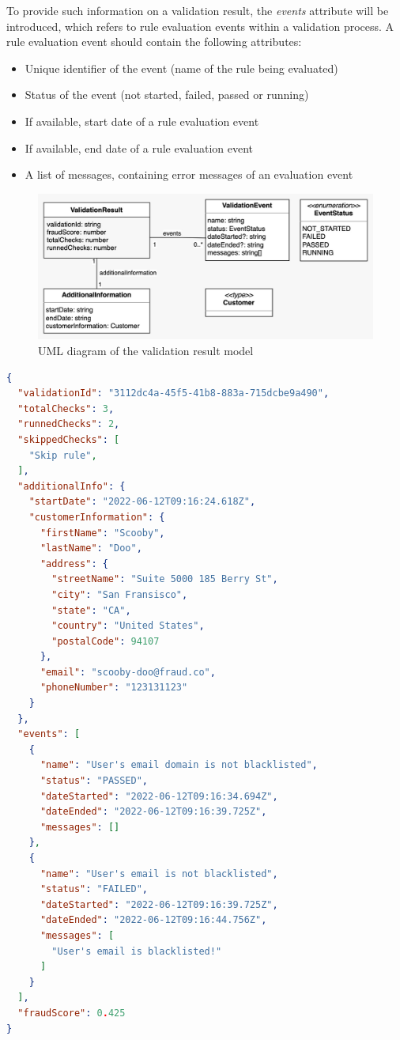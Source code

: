 To provide such information on a validation result, the \emph{events} attribute will be introduced, which refers to rule evaluation events within a validation process. A rule evaluation event should contain the following attributes:

\begin{itemize}
  \item Unique identifier of the event (name of the rule being evaluated)
  \item Status of the event (not started, failed, passed or running) 
  \item If available, start date of a rule evaluation event 
  \item If available, end date of a rule evaluation event 
  \item A list of messages, containing error messages of an evaluation event
\end{itemize}

\begin{figure}[!ht]
  \includegraphics[width=\textwidth]{diagrams/entity_validation_result.jpeg}
  \caption{UML diagram of the validation result model}
 \end{figure}
 
\begin{lstlisting}[caption={Validation result example (JSON)}, language=json]
{
  "validationId": "3112dc4a-45f5-41b8-883a-715dcbe9a490",
  "totalChecks": 3,
  "runnedChecks": 2,
  "skippedChecks": [
    "Skip rule",
  ],
  "additionalInfo": {
    "startDate": "2022-06-12T09:16:24.618Z",
    "customerInformation": {
      "firstName": "Scooby",
      "lastName": "Doo",
      "address": {
        "streetName": "Suite 5000 185 Berry St",
        "city": "San Fransisco",
        "state": "CA",
        "country": "United States",
        "postalCode": 94107
      },
      "email": "scooby-doo@fraud.co",
      "phoneNumber": "123131123"
    }
  },
  "events": [
    {
      "name": "User's email domain is not blacklisted",
      "status": "PASSED",
      "dateStarted": "2022-06-12T09:16:34.694Z",
      "dateEnded": "2022-06-12T09:16:39.725Z",
      "messages": []
    },
    {
      "name": "User's email is not blacklisted",
      "status": "FAILED",
      "dateStarted": "2022-06-12T09:16:39.725Z",
      "dateEnded": "2022-06-12T09:16:44.756Z",
      "messages": [
        "User's email is blacklisted!"
      ]
    }
  ],
  "fraudScore": 0.425  
}
\end{lstlisting}